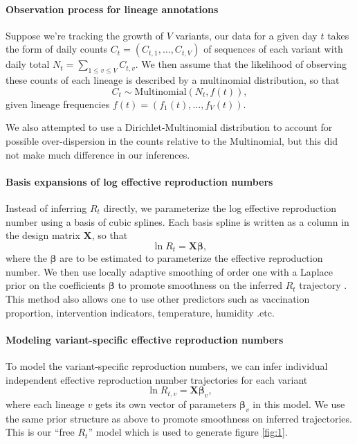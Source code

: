 \documentclass[11pt,oneside,letterpaper]{article}
\renewcommand{\vec}[1]{\boldsymbol{#1}}
\begin{document}
\paragraph{Observation process for lineage annotations}%

Suppose we're tracking the growth of $V$ variants, our data for a given day $t$ takes the form of daily counts $C_{t} = (C_{t,1}, \ldots, C_{t,V})$ of sequences of each variant with daily total $N_{t} = \sum_{1\leq v \leq V} C_{t, v}$.
We then assume that the likelihood of observing these counts of each lineage is described by a multinomial distribution, so that
\begin{equation}
    C_{t} \sim \text{Multinomial}(N_{t}, f(t)),
\end{equation}
given lineage frequencies $f(t) = (f_{1}(t), \ldots, f_{V}(t))$.

We also attempted to use a Dirichlet-Multinomial distribution to account for possible over-dispersion in the counts relative to the Multinomial, but this did not make much difference in our inferences.

\paragraph{Basis expansions of log effective reproduction numbers}%

Instead of inferring $R_{t}$ directly, we parameterize the log effective reproduction number using a basis of cubic splines.
Each basis spline is written as a column in the design matrix $\vec{X}$, so that
\begin{equation}
  \ln R_{t} = \vec{X} \vec{\beta},
\end{equation}
where the $\vec{\beta}$ are to be estimated to parameterize the effective reproduction number.
We then use locally adaptive smoothing of order one with a Laplace prior on the coefficients $\vec{\beta}$ to promote smoothness on the inferred $R_t$ trajectory \cite{Faulkner2018}.
This method also allows one to use other predictors such as vaccination proportion, intervention indicators, temperature, humidity .etc.

\paragraph{Modeling variant-specific effective reproduction numbers}%

To model the variant-specific reproduction numbers, we can infer individual independent effective reproduction number trajectories for each variant
\begin{equation}
  \ln R_{t, v} = \vec{X} \vec{\beta}_{v},
\end{equation}
where each lineage $v$ gets its own vector of parameters $\vec{\beta}_{v}$ in this model.
We use the same prior structure as above to promote smoothness on inferred trajectories. This is our ``free $R_{t}$'' model which is used to generate figure \ref{fig:1}.
\end{document}
